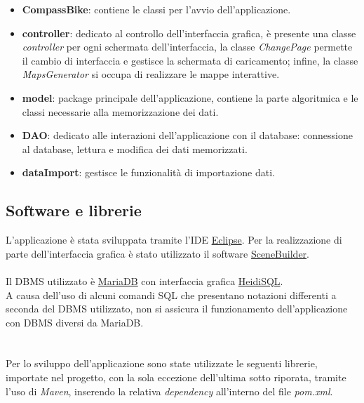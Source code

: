 \documentclass[a4paper, 12pt]{article}
\begin{document}
	\begin{itemize}
		\item \textbf{CompassBike}: contiene le classi per l'avvio dell'applicazione.
		\item \textbf{controller}:  dedicato al controllo dell'interfaccia grafica, è presente una classe \textit{controller} per ogni schermata dell'interfaccia, la classe \textit{ChangePage} permette il cambio di interfaccia e gestisce la schermata di caricamento; infine, la classe \textit{MapsGenerator} si occupa di realizzare le mappe interattive.
		\item \textbf{model}:  package principale dell'applicazione, contiene la parte algoritmica e le classi necessarie alla memorizzazione dei dati.
		\item \textbf{DAO}: dedicato alle interazioni dell'applicazione con il database: connessione al database, lettura e modifica dei dati memorizzati.
		\item \textbf{dataImport}: gestisce le funzionalità di importazione dati.
	\end{itemize}

\newpage

	\subsection{Software e librerie}

	L'applicazione è stata sviluppata tramite l'IDE \href{https://www.eclipse.org/}{Eclipse}. Per la realizzazione di parte dell'interfaccia grafica è stato utilizzato il software \href{https://gluonhq.com/products/scene-builder/}{SceneBuilder}.\\\\
	Il DBMS utilizzato è \href{https://mariadb.org/}{MariaDB} con interfaccia grafica \href{https://www.heidisql.com/}{HeidiSQL}.\\
	A causa dell'uso di alcuni comandi SQL che presentano notazioni differenti a seconda del DBMS utilizzato, non si assicura il funzionamento dell'applicazione con DBMS diversi da MariaDB.\\\\\\
Per lo sviluppo dell'applicazione sono state utilizzate le seguenti librerie, importate nel progetto, con la sola eccezione dell'ultima sotto riporata, tramite l'uso di \textit{Maven}, inserendo la relativa \textit{dependency} all'interno del file \textit{pom.xml}.
\end{document}
